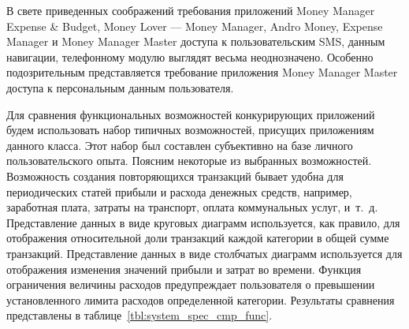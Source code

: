 В свете приведенных соображений требования приложений
Money Manager Expense \& Budget, Money Lover --- Money Manager,
Andro Money, Expense Manager и Money Manager Master доступа
к пользовательским SMS, данным навигации,
телефонному модулю выглядят весьма неоднозначено.
Особенно подозрительным представляется требование приложения
Money Manager Master доступа к персональным данным пользователя.

Для сравнения функциональных возможностей конкурирующих приложений
будем использовать набор типичных возможностей,
присущих приложениям данного класса.
Этот набор был составлен субъективно на базе личного пользовательского опыта.
Поясним некоторые из выбранных возможностей.
Возможность создания повторяющихся транзакций бывает удобна для
периодических статей прибыли и расхода денежных средств, например,
заработная плата, затраты на транспорт, оплата коммунальных услуг, и~т.~д.
Представление данных в виде круговых диаграмм используется,
как правило, для отображения относительной доли транзакций
каждой категории в общей сумме транзакций.
Представление данных в виде столбчатых диаграмм
используется для отображения изменения значений прибыли и затрат во времени.
Функция ограничения величины расходов предупреждает пользователя
о превышении установленного лимита расходов определенной категории.
Результаты сравнения представлены в таблице~\ref{tbl:system_spec_cmp_func}.

